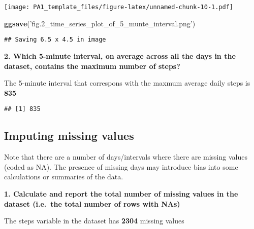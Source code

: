 \documentclass[]{article}
\newenvironment{Shaded}{\begin{snugshade}}{\end{snugshade}}
\newcommand{\KeywordTok}[1]{\textcolor[rgb]{0.13,0.29,0.53}{\textbf{#1}}}
\newcommand{\NormalTok}[1]{#1}
\newcommand{\OperatorTok}[1]{\textcolor[rgb]{0.81,0.36,0.00}{\textbf{#1}}}
\newcommand{\StringTok}[1]{\textcolor[rgb]{0.31,0.60,0.02}{#1}}
\begin{document}
\texttt{[image: PA1\_template\_files/figure-latex/unnamed-chunk-10-1.pdf]}

\begin{Shaded}
\begin{Highlighting}[]
\KeywordTok{ggsave}\NormalTok{(}\StringTok{'fig.2_time_series_plot_of_5_munte_interval.png'}\NormalTok{)}
\end{Highlighting}
\end{Shaded}

\begin{verbatim}
## Saving 6.5 x 4.5 in image
\end{verbatim}

\textbf{2. Which 5-minute interval, on average across all the days in
the dataset, contains the maximum number of steps?}

The 5-minute interval that correspons with the maxmum average daily
steps is \textbf{835}

\begin{Shaded}
\end{Shaded}

\begin{verbatim}
## [1] 835
\end{verbatim}

\hypertarget{imputing-missing-values}{%
\subsection{Imputing missing values}\label{imputing-missing-values}}

Note that there are a number of days/intervals where there are missing
values (coded as \color{red}{\verb|NA|}NA). The presence of missing days
may introduce bias into some calculations or summaries of the data.

\textbf{1. Calculate and report the total number of missing values in
the dataset (i.e.~the total number of rows with
\color{red}{\verb|NA|}NAs)}

The steps variable in the dataset has \textbf{2304} missing values

\begin{Shaded}
\end{Shaded}
\end{document}
